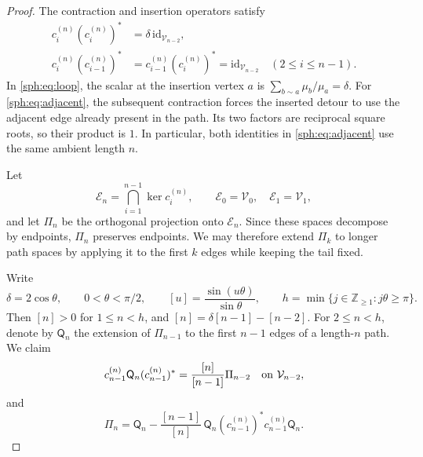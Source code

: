 \begin{proof}
The contraction and insertion operators satisfy
\begin{align}
 c_i^{(n)}(c_i^{(n)})^*
     &=\delta\,\mathrm{id}_{\mathcal V_{n-2}},
       \label{sph:eq:loop}\\
 c_i^{(n)}(c_{i-1}^{(n)})^*
     &=c_{i-1}^{(n)}(c_i^{(n)})^*
       =\mathrm{id}_{\mathcal V_{n-2}}
       \quad(2\leq i\leq n-1).
       \label{sph:eq:adjacent}
\end{align}
In \eqref{sph:eq:loop}, the scalar at the insertion vertex
\(a\) is \(\sum_{b\sim a}\mu_b/\mu_a=\delta\).
For \eqref{sph:eq:adjacent}, the subsequent contraction
forces the inserted detour to use the adjacent edge already
present in the path.  Its two factors are reciprocal square
roots, so their product is \(1\).  In particular, both
identities in \eqref{sph:eq:adjacent} use the same ambient
length \(n\).

Let
\[
 \mathcal E_n=\bigcap_{i=1}^{n-1}\ker c_i^{(n)},
 \qquad
 \mathcal E_0=\mathcal V_0,\quad
 \mathcal E_1=\mathcal V_1,
\]
and let \(\Pi_n\) be the orthogonal projection onto
\(\mathcal E_n\).  Since these spaces decompose by endpoints,
\(\Pi_n\) preserves endpoints.  We may therefore extend
\(\Pi_k\) to longer path spaces by applying it to the first
\(k\) edges while keeping the tail fixed.

Write
\[
 \delta=2\cos\theta,\qquad 0<\theta<\pi/2,\qquad
 [u]=\frac{\sin(u\theta)}{\sin\theta},
 \qquad h=\min\{j\in\mathbb Z_{\geq1}:j\theta\geq\pi\}.
\]
Then \([n]>0\) for \(1\leq n<h\), and
\([n]=\delta[n-1]-[n-2]\).
For \(2\leq n<h\), denote by \(\mathsf Q_n\) the extension
of \(\Pi_{n-1}\) to the first \(n-1\) edges of a length-\(n\)
path.  We claim
\begin{equation}\label{sph:eq:scalar}
 c_{n-1}^{(n)}\mathsf Q_n(c_{n-1}^{(n)})^*
     =\frac{[n]}{[n-1]}\Pi_{n-2}
     \quad\hbox{on }\mathcal V_{n-2},
\end{equation}
and
\begin{equation}\label{sph:eq:projection}
 \Pi_n=\mathsf Q_n-
       \frac{[n-1]}{[n]}\,
       \mathsf Q_n(c_{n-1}^{(n)})^*
                    c_{n-1}^{(n)}\mathsf Q_n.
\end{equation}


\end{proof}
